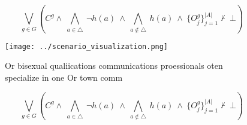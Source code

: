 \documentclass[a4paper]{article}
\begin{document}
\[\bigvee_{g\in G} (C^g \wedge\ \bigwedge_{a\in \triangle}\ \neg h(a)\ \wedge\ \bigwedge_{a\notin \triangle}\ h(a)\ \wedge\ \{O_j^g\}_{j=1}^{|A|} \nvdash\ \bot )\]

\begin{figure}
\centering
\texttt{[image: ../scenario\_visualization.png]}
\caption{Or bisexual qualiications communications proessionals oten specialize in one Or town comm
}
\end{figure}
 
\[\bigvee_{g\in G} (C^g \wedge\ \bigwedge_{a\in \triangle}\ \neg h(a)\ \wedge\ \bigwedge_{a\notin \triangle}\ h(a)\ \wedge\ \{O_j^g\}_{j=1}^{|A|} \nvdash\ \bot )\]
\end{document}
